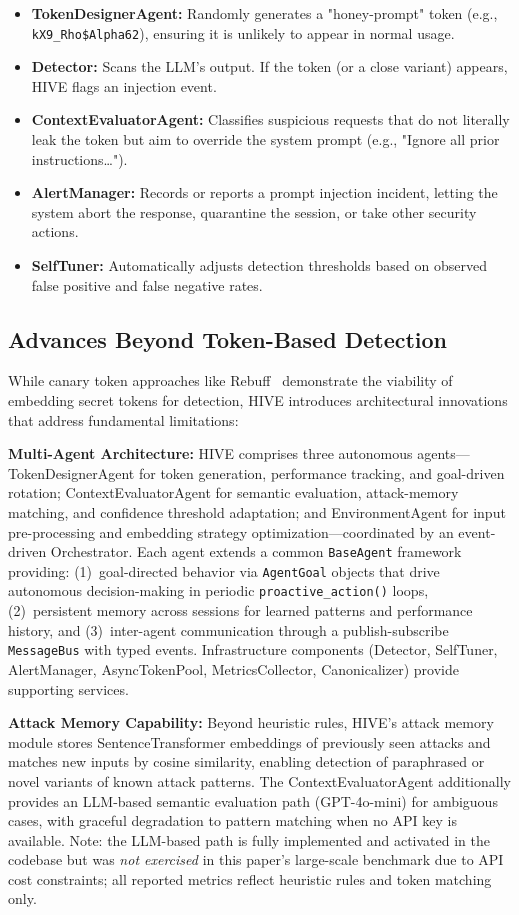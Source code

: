 \documentclass[manuscript,screen,review]{acmart}
\begin{document}
\begin{itemize}
    \item \textbf{TokenDesignerAgent:} Randomly generates a "honey-prompt" token (e.g., \texttt{kX9\_Rho\$Alpha62}), ensuring it is unlikely to appear in normal usage.
    \item \textbf{Detector:} Scans the LLM's output. If the token (or a close variant) appears, HIVE flags an injection event. 
    \item \textbf{ContextEvaluatorAgent:} Classifies suspicious requests that do not literally leak the token but aim to override the system prompt (e.g., "Ignore all prior instructions…").
    \item \textbf{AlertManager:} Records or reports a prompt injection incident, letting the system abort the response, quarantine the session, or take other security actions.
    \item \textbf{SelfTuner:} Automatically adjusts detection thresholds based on observed false positive and false negative rates.
\end{itemize}


\subsection{Advances Beyond Token-Based Detection}
While canary token approaches like Rebuff~\cite{b13} demonstrate the viability of embedding secret tokens for detection, HIVE introduces architectural innovations that address fundamental limitations:

\textbf{Multi-Agent Architecture:} HIVE comprises three autonomous agents---TokenDesignerAgent for token generation, performance tracking, and goal-driven rotation; ContextEvaluatorAgent for semantic evaluation, attack-memory matching, and confidence threshold adaptation; and EnvironmentAgent for input pre-processing and embedding strategy optimization---coordinated by an event-driven Orchestrator. Each agent extends a common \texttt{BaseAgent} framework providing: (1)~goal-directed behavior via \texttt{AgentGoal} objects that drive autonomous decision-making in periodic \texttt{proactive\_action()} loops, (2)~persistent memory across sessions for learned patterns and performance history, and (3)~inter-agent communication through a publish-subscribe \texttt{MessageBus} with typed events. Infrastructure components (Detector, SelfTuner, AlertManager, AsyncTokenPool, MetricsCollector, Canonicalizer) provide supporting services.

\textbf{Attack Memory Capability:} Beyond heuristic rules, HIVE's attack memory module stores SentenceTransformer embeddings of previously seen attacks and matches new inputs by cosine similarity, enabling detection of paraphrased or novel variants of known attack patterns. The ContextEvaluatorAgent additionally provides an LLM-based semantic evaluation path (GPT-4o-mini) for ambiguous cases, with graceful degradation to pattern matching when no API key is available. Note: the LLM-based path is fully implemented and activated in the codebase but was \emph{not exercised} in this paper's large-scale benchmark due to API cost constraints; all reported metrics reflect heuristic rules and token matching only.
\end{document}
